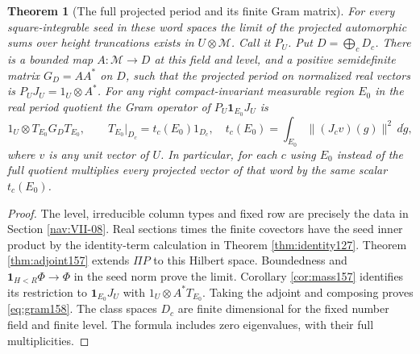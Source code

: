 \documentclass[a4paper,11pt]{article}
\newtheorem{theorem}[proposition]{Theorem}
\theoremstyle{definition}
\theoremstyle{remark}
\numberwithin{equation}{section}
\begin{document}
\begin{theorem}[The full projected period and its finite Gram matrix]
\label{thm:global158}
For every square-integrable seed in these word spaces the limit
of the projected automorphic sums over height truncations exists
in \(U\otimes\mathcal M\). Call it \(P_U\). Put \(D=\bigoplus_c
D_c\). There is a bounded map \(A:\mathcal M\to D\) at this
field and level, and a positive semidefinite matrix \(G_D=AA^*\)
on \(D\), such that the projected period on normalized real
vectors is \(P_U J_U=1_U\otimes A^*\). For any right
compact-invariant measurable region \(E_0\) in the real period
quotient the Gram operator of \(P_U\mathbf1_{E_0}J_U\) is
\begin{equation}
       1_U\otimes T_{E_0} G_D T_{E_0},\qquad
       T_{E_0}|_{D_c}=t_c(E_0)1_{D_c},
       \quad t_c(E_0)=\int_{E_0}\|(J_cv)(g)\|^2\,d\dot g ,
       \label{eq:gram158}
\end{equation}
where \(v\) is any unit vector of \(U\).
In particular, for each \(c\) using \(E_0\) instead of the
full quotient multiplies every projected vector of that word
by the same scalar \(t_c(E_0)\).
\end{theorem}
\begin{proof}
The level, irreducible column types and fixed row are precisely
the data in Section \ref{nav:VII-08}. Real sections times the finite covectors have the
seed inner product by the identity-term calculation in Theorem \ref{thm:identity127}. Theorem \ref{thm:adjoint157} extends \(\Pi P\) to
this Hilbert space. Boundedness and
\(\mathbf1_{H<R}\Phi\to\Phi\) in the seed norm prove the limit.
Corollary \ref{cor:mass157} identifies its restriction to
\(\mathbf1_{E_0}J_U\) with \(1_U\otimes A^*T_{E_0}\).
Taking the adjoint and composing proves \eqref{eq:gram158}.
The class spaces \(D_c\) are finite dimensional for the fixed
number field and finite level. The formula includes zero
eigenvalues, with their full multiplicities.
\end{proof}
\end{document}
